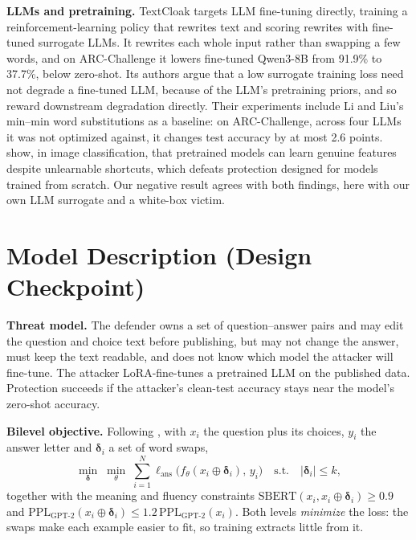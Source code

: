 \documentclass{article}
\begin{document}
\textbf{LLMs and pretraining.} TextCloak \citep{zhao2026textcloak} targets LLM fine-tuning directly, training a
reinforcement-learning policy that rewrites text and scoring rewrites with fine-tuned surrogate LLMs. It rewrites each whole
input rather than swapping a few words, and on ARC-Challenge it lowers fine-tuned Qwen3-8B from 91.9\% to 37.7\%,
below zero-shot. Its authors argue that a low surrogate training loss need not degrade a fine-tuned LLM, because of the
LLM's pretraining priors, and so reward downstream degradation directly. Their experiments include Li and Liu's
min--min word substitutions as a baseline: on ARC-Challenge, across four LLMs it was not optimized against, it changes
test accuracy by at most 2.6 points. \citet{li2026priors} show, in image classification, that pretrained models can
learn genuine features despite unlearnable shortcuts, which defeats protection designed for models trained from scratch.
Our negative result agrees with both findings, here with our own LLM surrogate and a white-box victim.

\section{Model Description (Design Checkpoint)}\label{sec:method}
\textbf{Threat model.} The defender owns a set of question--answer pairs and may edit the question and choice text
before publishing, but may not change the answer, must keep the text readable, and does not know which model the
attacker will fine-tune. The attacker LoRA-fine-tunes a pretrained LLM on the published data. Protection succeeds if the
attacker's clean-test accuracy stays near the model's zero-shot accuracy.

\textbf{Bilevel objective.} Following \citet{huang2021unlearnable}, with $x_i$ the question plus its choices, $y_i$
the answer letter and $\boldsymbol\delta_i$ a set of word swaps,
\begin{equation}
\min_{\boldsymbol\delta}\;\min_{\theta}\;\sum_{i=1}^{N}\ell_{\text{ans}}\big(f_\theta(x_i\oplus\boldsymbol\delta_i),\,y_i\big)
\quad\text{s.t.}\quad |\boldsymbol\delta_i|\le k,
\end{equation}
together with the meaning and fluency constraints $\text{SBERT}(x_i,x_i\oplus\boldsymbol\delta_i)\ge 0.9$ and
$\text{PPL}_{\text{GPT-2}}(x_i\oplus\boldsymbol\delta_i)\le 1.2\,\text{PPL}_{\text{GPT-2}}(x_i)$.
Both levels \emph{minimize} the loss: the swaps make each example easier to fit, so training extracts little from it.
\end{document}
